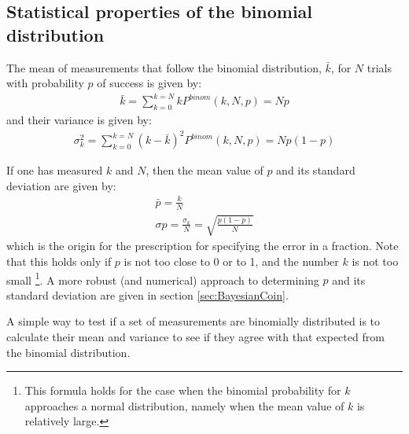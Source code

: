 \subsection{Statistical properties of the binomial distribution}
The mean of measurements that follow the binomial distribution, $\bar k$, for $N$ trials with probability $p$ of success is given by:
\begin{align}
\bar k = \sum_{k=0}^{k=N}kP^{binom}(k,N,p)=Np
\end{align}
and their variance is given by:
\begin{align}
\sigma_k^2 = \sum_{k=0}^{k=N}(k-\bar k)^2P^{binom}(k,N,p)=Np(1-p)
\end{align}

If one has measured $k$ and $N$, then the mean value of $p$ and its standard deviation are given by:
\begin{align}
\bar p = \frac{k}{N}\\
\sigma p = \frac{\sigma_k}{N}=\sqrt{\frac{p(1-p)}{N}}
\end{align}
which is the origin for the prescription for specifying the error in a fraction. Note that this holds only if $p$ is not too close to 0 or to 1, and the number $k$ is not too small \footnote{This formula holds for the case when the binomial probability for $k$ approaches a normal distribution, namely when the mean value of $k$ is relatively large.}. A more robust (and numerical) approach to determining $p$ and its standard deviation are given in section \ref{sec:BayesianCoin}.

A simple way to test if a set of measurements are binomially distributed is to calculate their mean and variance to see if they agree with that expected from the binomial distribution.

